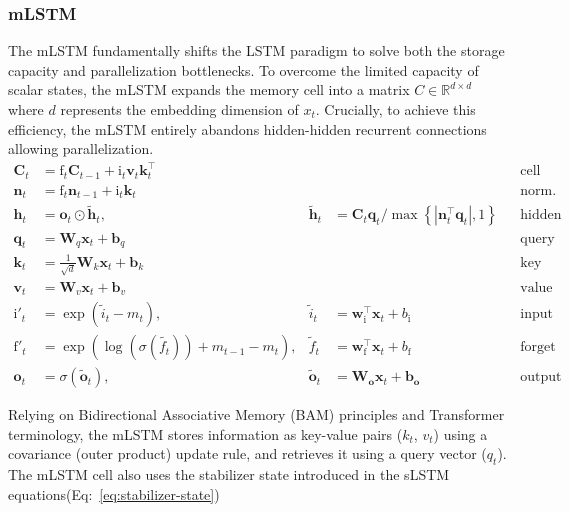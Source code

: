 \subsubsection{mLSTM}
The mLSTM fundamentally shifts the LSTM paradigm to solve both the storage capacity 
and parallelization bottlenecks. To overcome the limited capacity of scalar states, the mLSTM 
expands the memory cell into a matrix $C \in \mathbb{R}^{d \times d}$ where $d$ represents the embedding dimension of $x_{t}$. Crucially, to achieve 
this efficiency, the mLSTM entirely abandons hidden-hidden recurrent connections allowing parallelization.
%
\begin{align}
    \boldsymbol{C}_t &= \mathrm{f}_t \boldsymbol{C}_{t-1} + \mathrm{i}_t \boldsymbol{v}_t \boldsymbol{k}_t^\top && && \text{cell state} \\
    \boldsymbol{n}_t &= \mathrm{f}_t \boldsymbol{n}_{t-1} + \mathrm{i}_t \boldsymbol{k}_t && && \text{norm. state} \\
    \boldsymbol{h}_t &= \mathbf{o}_t \odot \tilde{\boldsymbol{h}}_t, & \tilde{\boldsymbol{h}}_t &= \boldsymbol{C}_t \boldsymbol{q}_t / \max \left\{ \left| \boldsymbol{n}_t^\top \boldsymbol{q}_t \right|, 1 \right\} && \text{hidden state} \\
    \boldsymbol{q}_t &= \boldsymbol{W}_q \boldsymbol{x}_t + \boldsymbol{b}_q && && \text{query input} \\
    \boldsymbol{k}_t &= \frac{1}{\sqrt{d}} \boldsymbol{W}_k \boldsymbol{x}_t + \boldsymbol{b}_k && && \text{key input} \\
    \boldsymbol{v}_t &= \boldsymbol{W}_v \boldsymbol{x}_t + \boldsymbol{b}_v && && \text{value input} \\
    \mathrm{i'}_t &= \exp(\tilde{i}_t - m_t), & \tilde{i}_t &= \boldsymbol{w}_{\mathrm{i}}^\top \boldsymbol{x}_t + b_{\mathrm{i}} && \text{input gate} \\
    \mathrm{f'}_t &= \exp \left( \log(\sigma(\tilde{f_t})) + m_{t-1} - m_t \right), & \tilde{f}_t &= \boldsymbol{w}_{\mathrm{f}}^\top \boldsymbol{x}_t + b_{\mathrm{f}} && \text{forget gate} \\
    \mathbf{o}_t &= \sigma(\tilde{\mathbf{o}}_t), & \tilde{\mathbf{o}}_t &= \boldsymbol{W}_{\mathbf{o}} \boldsymbol{x}_t + \boldsymbol{b}_{\mathbf{o}} && \text{output gate}
\end{align}

\noindent Relying on Bidirectional Associative Memory (BAM)\cite{kosko1987adaptive} principles and Transformer terminology,
the mLSTM stores information as key-value pairs ($k_t$, $v_t$) using a covariance (outer product) 
update rule, and retrieves it using a query vector ($q_t$).
The mLSTM cell also uses the stabilizer state introduced in the sLSTM equations(Eq:~\ref{eq:stabilizer-state})
%